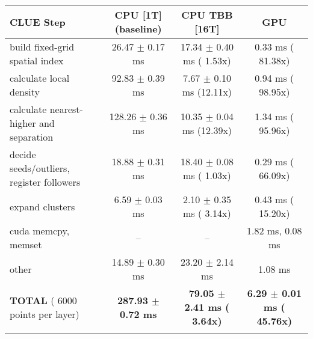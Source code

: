     \begin{tabular}{l|c|c|c}
    \hline
    CLUE Step                                 & CPU [1T] (baseline)         & CPU TBB [16T]                         & GPU                       \\ \hline
    build fixed-grid spatial index            &  26.47 $\pm$  0.17 ms       &  17.34 $\pm$  0.40 ms ( 1.53x)        &   0.33 ms ( 81.38x)       \\
    calculate local density                   &  92.83 $\pm$  0.39 ms       &   7.67 $\pm$  0.10 ms (12.11x)        &   0.94 ms ( 98.95x)       \\
    calculate nearest-higher and separation   & 128.26 $\pm$  0.36 ms       &  10.35 $\pm$  0.04 ms (12.39x)        &   1.34 ms ( 95.96x)       \\
    decide seeds/outliers, register followers &  18.88 $\pm$  0.31 ms       &  18.40 $\pm$  0.08 ms ( 1.03x)        &   0.29 ms ( 66.09x)       \\
    expand clusters                           &   6.59 $\pm$  0.03 ms       &   2.10 $\pm$  0.35 ms ( 3.14x)        &   0.43 ms ( 15.20x)       \\ \hline
    cuda memcpy, memset                       & --                          & --                                    &   1.82 ms,   0.08 ms      \\ 
    other                                     &  14.89 $\pm$  0.30 ms       &  23.20 $\pm$  2.14 ms                 &   1.08 ms                 \\ \hline
    \textbf{TOTAL} ( 6000 points per layer)   & \textbf{287.93 $\pm$  0.72 ms} & \textbf{ 79.05 $\pm$  2.41 ms ( 3.64x)} & \textbf{  6.29 $\pm$  0.01 ms ( 45.76x)}  \\
    \hline
    \multicolumn{4}{c}{} 
    \end{tabular}
    \linebreak


